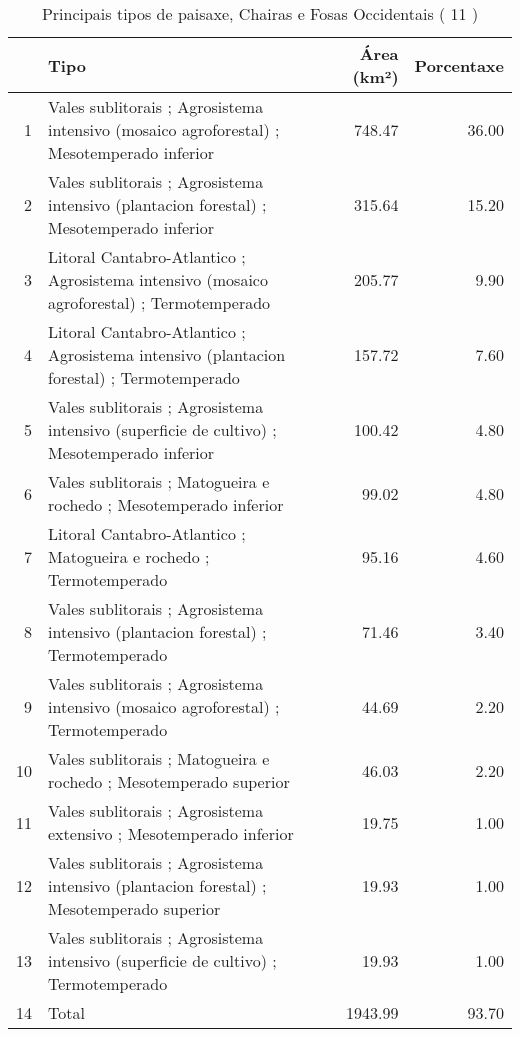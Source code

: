 \begin{table}[p]
\centering
\caption{Principais tipos de paisaxe,  Chairas e Fosas Occidentais ( 11 )} 
\label{Tipos 11}
\begin{tabular}{rlrr}
  \hline
 & Tipo & Área (km²) & Porcentaxe \\ 
  \hline
1 & Vales sublitorais ; Agrosistema intensivo (mosaico agroforestal) ; Mesotemperado inferior & 748.47 & 36.00 \\ 
  2 & Vales sublitorais ; Agrosistema intensivo (plantacion forestal) ; Mesotemperado inferior & 315.64 & 15.20 \\ 
  3 & Litoral Cantabro-Atlantico ; Agrosistema intensivo (mosaico agroforestal) ; Termotemperado & 205.77 & 9.90 \\ 
  4 & Litoral Cantabro-Atlantico ; Agrosistema intensivo (plantacion forestal) ; Termotemperado & 157.72 & 7.60 \\ 
  5 & Vales sublitorais ; Agrosistema intensivo (superficie de cultivo) ; Mesotemperado inferior & 100.42 & 4.80 \\ 
  6 & Vales sublitorais ; Matogueira e rochedo ; Mesotemperado inferior & 99.02 & 4.80 \\ 
  7 & Litoral Cantabro-Atlantico ; Matogueira e rochedo ; Termotemperado & 95.16 & 4.60 \\ 
  8 & Vales sublitorais ; Agrosistema intensivo (plantacion forestal) ; Termotemperado & 71.46 & 3.40 \\ 
  9 & Vales sublitorais ; Agrosistema intensivo (mosaico agroforestal) ; Termotemperado & 44.69 & 2.20 \\ 
  10 & Vales sublitorais ; Matogueira e rochedo ; Mesotemperado superior & 46.03 & 2.20 \\ 
  11 & Vales sublitorais ; Agrosistema extensivo ; Mesotemperado inferior & 19.75 & 1.00 \\ 
  12 & Vales sublitorais ; Agrosistema intensivo (plantacion forestal) ; Mesotemperado superior & 19.93 & 1.00 \\ 
  13 & Vales sublitorais ; Agrosistema intensivo (superficie de cultivo) ; Termotemperado & 19.93 & 1.00 \\ 
  14 & Total & 1943.99 & 93.70 \\ 
   \hline
\end{tabular}
\end{table}
